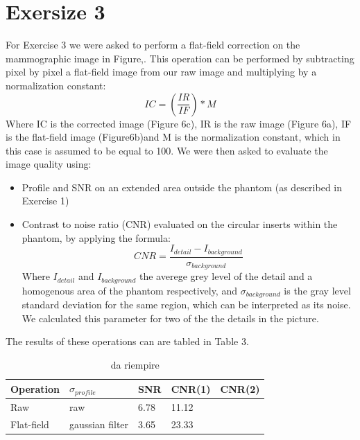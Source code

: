 \documentclass[a4paper]{article}
\begin{document}
\section*{Exersize 3}
For Exercise 3 we were asked to perform a flat-field correction on the mammographic image in Figure,. This operation can be performed by subtracting pixel by pixel a flat-field image from our raw image and multiplying by a normalization constant:
\begin{equation}
IC=(\frac{IR}{IF})* M
\end{equation}
Where IC is the corrected image (Figure 6c), IR is the raw image (Figure 6a), IF is the flat-field image (Figure6b)and M is the normalization constant, which in this case is assumed to be equal to 100.
We were then asked to evaluate the image quality using:
\begin{itemize}
	\item Profile and SNR on an extended area outside the phantom (as described in Exercise 1)
	\item Contrast to noise ratio (CNR) evaluated on the circular inserts within the phantom, by applying the formula:
	\begin{equation}
	CNR=\frac{I_{detail}-I_{background}}{\sigma_{background}}
	\end{equation}
	Where $I_{detail}$ and $I_{background}$ the averege grey level of the detail and a homogenous area of the phantom respectively, and $\sigma_{background}$ is the gray level standard deviation for the same region, which can be interpreted as its noise. We calculated this parameter for two of the the details in the picture.
\end{itemize}
The results of these operations can are tabled in Table 3.

\begin{table}[h]
	\begin {center}
	\begin{tabular}{| l | l | l | l | l |}
		\hline
		 Operation & $\sigma_{profile}$ & SNR & CNR(1) & CNR(2)\\ \hline
		Raw& raw & 6.78 & 11.12  &\\ \hline
		 Flat-field& gaussian filter & 3.65 & 23.33 &\\ \hline

	\end{tabular}
	\caption{da riempire}
\end{center}
\end{table}
\clearpage
\end{document}

